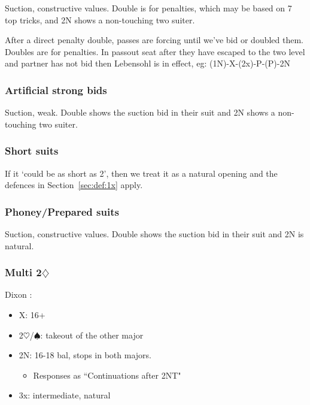 \documentclass[a4paper,14pt]{extarticle}
\begin{document}
Suction, constructive values. Double is for penalties, which may be based on 7
top tricks, and 2N shows a non-touching two suiter. 

After a direct penalty double, passes are forcing until we've bid or doubled
them.  Doubles are for penalties. In passout seat after they have escaped to
the two level and partner has not bid then Lebensohl 
is in effect, eg: (1N)-X-(2x)-P-(P)-2N

\subsubsection{Artificial strong bids}
\label{sec:def:strong}

Suction, weak. Double shows the suction bid in their suit and 2N shows a
non-touching two suiter. 

\subsubsection{Short suits}
\label{sec:def:short}

If it `could be as short as 2', then we treat it as a natural opening and the
defences in Section~\ref{sec:def:1x} apply.

\subsubsection{Phoney/Prepared suits}
\label{sec:def:phoney}

Suction, constructive values. Double shows the suction bid in their suit and 2N
is natural. 

\newpage 

\subsubsection{Multi 2$\diamondsuit$}
\label{sec:def:multi}

\label{note:15}
Dixon :

\begin{itemize}
\item X: 16+
\item 2$\heartsuit$/$\spadesuit$: takeout of the other major
\item 2N: 16-18 bal, stops in both majors.
	\begin{itemize}
	\item Responses as ``Continuations after 2NT" 
	\end{itemize}
\item 3x: intermediate, natural
\end{itemize}
\end{document}
